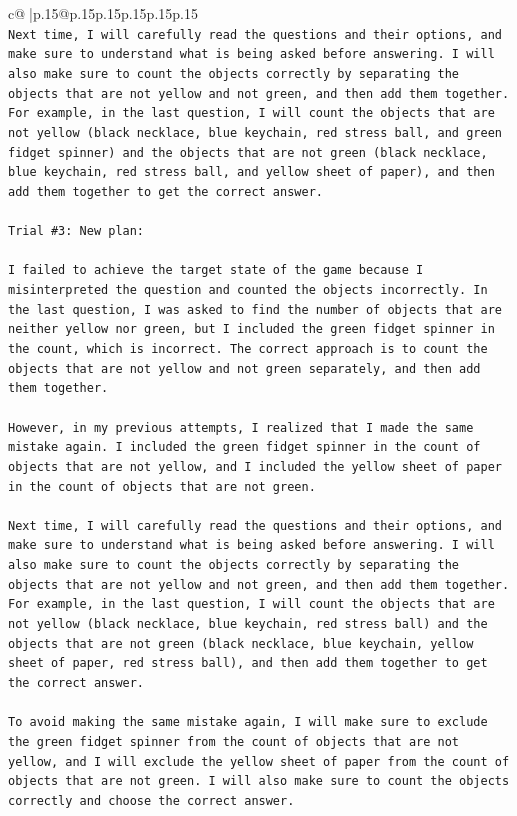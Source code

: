\documentclass{article}
\begin{document}
{\begin{supertabular}{c@{$\;$}|p{.15\linewidth}@{}p{.15\linewidth}p{.15\linewidth}p{.15\linewidth}p{.15\linewidth}p{.15\linewidth}}
{{{\\ 
\texttt{Next time, I will carefully read the questions and their options, and make sure to understand what is being asked before answering. I will also make sure to count the objects correctly by separating the objects that are not yellow and not green, and then add them together. For example, in the last question, I will count the objects that are not yellow (black necklace, blue keychain, red stress ball, and green fidget spinner) and the objects that are not green (black necklace, blue keychain, red stress ball, and yellow sheet of paper), and then add them together to get the correct answer.} \\
\\ 
\texttt{Trial \#3: New plan: } \\
\\ 
\texttt{I failed to achieve the target state of the game because I misinterpreted the question and counted the objects incorrectly. In the last question, I was asked to find the number of objects that are neither yellow nor green, but I included the green fidget spinner in the count, which is incorrect. The correct approach is to count the objects that are not yellow and not green separately, and then add them together.} \\
\\ 
\texttt{However, in my previous attempts, I realized that I made the same mistake again. I included the green fidget spinner in the count of objects that are not yellow, and I included the yellow sheet of paper in the count of objects that are not green.} \\
\\ 
\texttt{Next time, I will carefully read the questions and their options, and make sure to understand what is being asked before answering. I will also make sure to count the objects correctly by separating the objects that are not yellow and not green, and then add them together. For example, in the last question, I will count the objects that are not yellow (black necklace, blue keychain, red stress ball) and the objects that are not green (black necklace, blue keychain, yellow sheet of paper, red stress ball), and then add them together to get the correct answer.} \\
\\ 
\texttt{To avoid making the same mistake again, I will make sure to exclude the green fidget spinner from the count of objects that are not yellow, and I will exclude the yellow sheet of paper from the count of objects that are not green. I will also make sure to count the objects correctly and choose the correct answer.} \\
}}}
\end{supertabular}}
\end{document}
